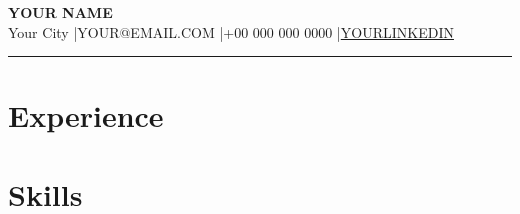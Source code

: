 \documentclass[10pt, a4paper]{article}
\begin{document}
{\LARGE\bfseries YOUR NAME}\\[4pt]
Your City \quad|\quad YOUR@EMAIL.COM \quad|\quad +00 000 000 0000 \quad|\quad \href{https://YOURLINKEDIN}{YOURLINKEDIN}
\vspace{4pt}\hrule\vspace{6pt}


\section{Experience}

\section{Skills}
\end{document}
